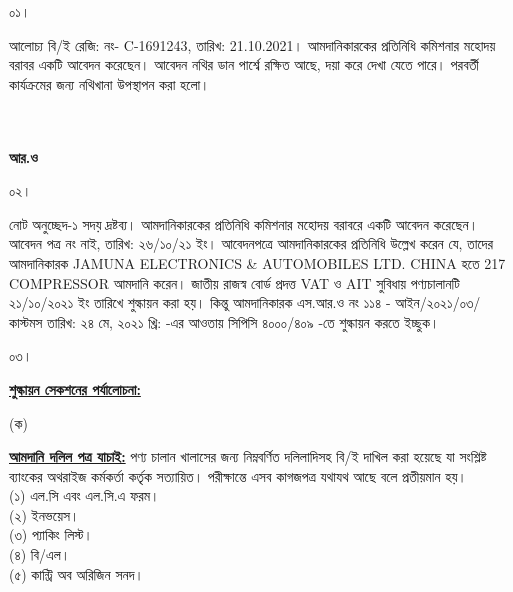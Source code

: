 \documentclass[12pt]{article}
\newcommand{\good}{COMPRESSOR}
\newcommand{\pkg}{217}
\newcommand{\co}{CHINA}
\newcommand{\beno}{C-1691243}
\newcommand{\bedt}{21.10.2021}
\newcommand{\impn}{JAMUNA ELECTRONICS \& AUTOMOBILES LTD.}
\newcommand{\sro}{এস.আর.ও নং ১১৪ - আইন/২০২১/০৩/কাস্টমস}
\newcommand{\srodt}{তারিখ: ২৪ মে, ২০২১ খ্রি:}
\newcommand{\cpcfzn}{সিপিসি ৪০০০/৪০৯}
\begin{document}
\noindent
\begin{minipage}[t]{0.05\linewidth}
০১।
\end{minipage}
\begin{minipage}[t]{0.95\linewidth}
আলোচ্য বি/ই রেজি: নং- {\beno}, তারিখ: {\bedt}।
আমদানিকারকের প্রতিনিধি কমিশনার মহোদয় বরাবর একটি
আবেদন করেছেন।
আবেদন নথির ডান পার্শ্বে রক্ষিত আছে,
দয়া করে দেখা যেতে পারে।
পরবর্তী কার্যক্রমের জন্য নথিখানা উপস্থাপন করা হলো।
\\
\\
\\
\end{minipage}
\begin{minipage}[t]{0.05\linewidth}
\hspace*{1em}
\end{minipage}
\begin{minipage}[t]{0.45\linewidth}
\hspace*{1em}
\end{minipage}
\begin{minipage}[t]{0.50\linewidth}
\textbf{আর.ও}
\\
\end{minipage}
\begin{minipage}[t]{0.05\linewidth}
০২।
\end{minipage}
\begin{minipage}[t]{0.95\linewidth}
নোট অনুচ্ছেদ-১ সদয় দ্রষ্টব্য। আমদানিকারকের
প্রতিনিধি কমিশনার মহোদয় বরাবরে একটি
আবেদন করেছেন।
আবেদন পত্র নং নাই, তারিখ: ২৬/১০/২১ ইং।
আবেদনপত্রে আমদানিকারকের প্রতিনিধি উল্লেখ
করেন যে,
তাদের আমদানিকারক {\impn} {\co}
হতে {\pkg}
{\good} আমদানি করেন।
জাতীয় রাজস্ব বোর্ড প্রদত্ত
VAT ও AIT
সুবিধায় পণ্যচালানটি ২১/১০/২০২১ ইং
তারিখে শুল্কায়ন করা হয়।
কিন্তু আমদানিকারক {\sro} {\srodt}
-এর আওতায় {\cpcfzn} -তে শুল্কায়ন
করতে ইচ্ছুক।
\\
\end{minipage}
\begin{minipage}[t]{0.05\linewidth}
০৩।
\end{minipage}
\begin{minipage}[t]{0.95\linewidth}
\underline{\textbf{শুল্কায়ন সেকশনের পর্যালোচনা:}}
\end{minipage}
\begin{minipage}[t]{0.05\linewidth}
\hspace{1em}
\end{minipage}
\begin{minipage}[t]{0.05\linewidth}
(ক)
\end{minipage}
\begin{minipage}[t]{0.90\linewidth}
\underline{\textbf{আমদানি দলিল পত্র যাচাই:}}
পণ্য চালান খালাসের জন্য নিম্নবর্ণিত দলিলাদিসহ বি/ই দাখিল করা
হয়েছে যা সংশ্লিষ্ট ব্যাংকের অথরাইজ কর্মকর্তা কর্তৃক সত্যায়িত।
পরীক্ষান্তে এসব কাগজপত্র যথাযথ আছে বলে প্রতীয়মান হয়।
\\
(১) এল.সি এবং এল.সি.এ ফরম।
\\
(২) ইনভয়েস।
\\
(৩) প্যাকিং লিস্ট।
\\
(৪) বি/এল।
\\
(৫) কান্ট্রি অব অরিজিন সনদ।
\\
\end{minipage}
\end{document}
